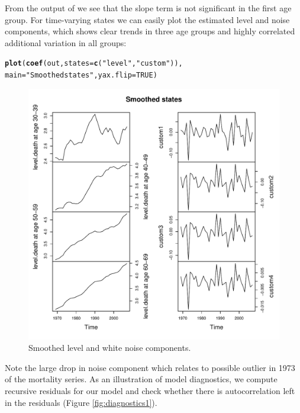 \documentclass[nojss,article]{jss}\usepackage[]{graphicx}\usepackage[]{color}
\makeatletter
\newcommand{\hlnum}[1]{\textcolor[rgb]{0.686,0.059,0.569}{#1}}%
\newcommand{\hlstr}[1]{\textcolor[rgb]{0.192,0.494,0.8}{#1}}%
\newcommand{\hlstd}[1]{\textcolor[rgb]{0.345,0.345,0.345}{#1}}%
\newcommand{\hlkwc}[1]{\textcolor[rgb]{0.333,0.667,0.333}{#1}}%
\newcommand{\hlkwd}[1]{\textcolor[rgb]{0.737,0.353,0.396}{\textbf{#1}}}%
\newenvironment{kframe}{%
 \def\at@end@of@kframe{}%
 \ifinner\ifhmode%
  \def\at@end@of@kframe{\end{minipage}}%
  \begin{minipage}{\columnwidth}%
 \fi\fi%
 \def\FrameCommand##1{\hskip\@totalleftmargin \hskip-\fboxsep
 \colorbox{shadecolor}{##1}\hskip-\fboxsep
     \hskip-\linewidth \hskip-\@totalleftmargin \hskip\columnwidth}%
 \MakeFramed {\advance\hsize-\width
   \@totalleftmargin\z@ \linewidth\hsize
   \@setminipage}}%
 {\par\unskip\endMakeFramed%
 \at@end@of@kframe}
\newenvironment{knitrout}{}{} %
\makeatother
\begin{document}
From the output of  we see that the slope term is not significant in the first age group. For time-varying states we can easily plot the estimated level and noise components, which shows clear trends in three age groups and highly correlated additional variation in all groups:

\begin{knitrout}
\color{fgcolor}\begin{kframe}
\begin{alltt}
\hlkwd{plot}\hlstd{(}\hlkwd{coef}\hlstd{(out,}\hlkwc{states}\hlstd{=}\hlkwd{c}\hlstd{(}\hlstr{"level"}\hlstd{,}\hlstr{"custom"}\hlstd{)),}
     \hlkwc{main} \hlstd{=} \hlstr{"Smoothed states"}\hlstd{,} \hlkwc{yax.flip}\hlstd{=}\hlnum{TRUE}\hlstd{)}
\end{alltt}
\end{kframe}\begin{figure}[!ht]

\includegraphics[width=\linewidth]{figure/states} \caption[Smoothed level and white noise components]{Smoothed level and white noise components.\label{fig:states}}
\end{figure}


\end{knitrout}

Note the large drop in noise component which relates to possible outlier in 1973 of the mortality series. As an illustration of model diagnostics, we compute recursive residuals for our model and check whether there is autocorrelation left in the residuals (Figure \ref{fig:diagnostics1}).
\end{document}
